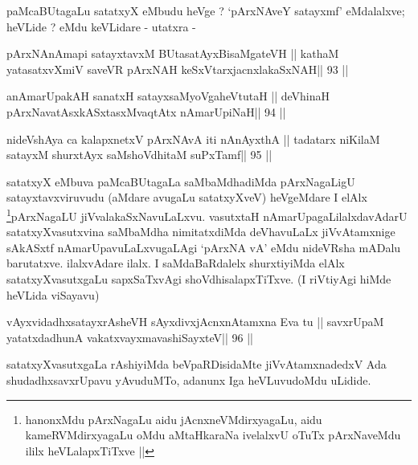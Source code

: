 \begin{artha}
paMcaBUtagaLu satatxyX eMbudu heVge ? `pArxNAveY satayxmf' eMdalalxve;
heVLide ? eMdu keVLidare - utatxra -
\end{artha}

\begin{shl}
pArxNAnAmapi satayxtavxM \footnotemark[1]BUtasatAyxBisaMgateVH ||
kathaM yatasatxvXmiV saveVR pArxNAH keSxVtarxjacnxlakaSxNAH\hfill || 93 ||
\end{shl}

\begin{shl}
anAmarUpakAH sanatxH satayxsaMyoVgaheVtutaH ||
deVhinaH pArxNavatAsxkASxtasxMvaqtAtx nAmarUpiNaH\hfill || 94 ||
\end{shl}

\begin{shl}
nideVshAya ca kalapxnetxV pArxNAvA iti  nAnAyxthA ||
tadatarx niKilaM satayxM shurxtAyx saMshoVdhitaM suPxTamf\hfill || 95 ||
\end{shl}

\begin{artha}
satatxyX eMbuva paMcaBUtagaLa saMbaMdhadiMda pArxNagaLigU
satayxtavxviruvudu (aMdare avugaLu satatxyXveV) heVgeMdare I
elAlx \footnote[1]{hanonxMdu pArxNagaLu aidu jAcnxneVMdirxyagaLu, aidu
kameRVMdirxyagaLu oMdu aMtaHkaraNa ivelalxvU oTuTx pArxNaveMdu ililx
heVLalapxTiTxve ||}pArxNagaLU jiVvalakaSxNavuLaLxvu. vasutxtaH
nAmarUpagaLilalxdavAdarU satatxyXvasutxvina saMbaMdha nimitatxdiMda
deVhavuLaLx jiVvAtamxnige sAkASxtf nAmarUpavuLaLxvugaLAgi `pArxNA vA'
eMdu nideVRsha mADalu barutatxve. ilalxvAdare ilalx. I saMdaBaRdalelx
shurxtiyiMda elAlx satatxyXvasutxgaLu sapxSaTxvAgi
shoVdhisalapxTiTxve. (I riVtiyAgi hiMde heVLida viSayavu) 
\end{artha}


\begin{shl}
vAyxvidadhxsatayxrAsheVH sAyxdivxjAcnxnAtamxna Eva tu ||
savxrUpaM yatatxdadhunA vakatxvayxmavashiSayxteV\hfill || 96 ||
\end{shl}

\begin{artha}
satatxyXvasutxgaLa rAshiyiMda beVpaRDisidaMte jiVvAtamxnadedxV Ada
shudadhxsavxrUpavu yAvuduMTo, adanunx Iga heVLuvudoMdu uLidide.
\end{artha}

